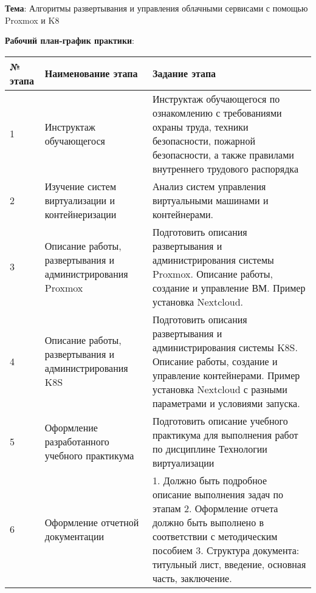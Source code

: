 
\textbf{Тема}: Алгоритмы развертывания и управления облачными сервисами с помощью Proxmox и K8

\textbf{Рабочий план-график практики}:

\begin{longtable}{|p{1cm}|p{6cm}|p{7cm}|}
    \hline
    № этапа & Наименование этапа & Задание этапа \\
    \hline
    1 & Инструктаж обучающегося & Инструктаж обучающегося по ознакомлению с требованиями охраны труда, техники безопасности, пожарной безопасности, а также правилами внутреннего трудового распорядка \\
    \hline
    2 & Изучение систем виртуализации и контейнеризации & Анализ систем управления виртуальными машинами и контейнерами. \\
    \hline
    3 & Описание работы, развертывания и администрирования Proxmox & Подготовить описания развертывания и администрирования системы Proxmox. Описание работы, создание и управление ВМ. Пример установка Nextcloud. \\
    \hline
    4 & Описание работы, развертывания и администрирования K8S & Подготовить описания развертывания и администрирования системы K8S. Описание работы, создание и управление контейнерами. Пример установка Nextcloud с разными параметрами и условиями запуска. \\
    \hline
    5 & Оформление разработанного учебного практикума & Подготовить описание учебного практикума для выполнения работ по дисциплине Технологии виртуализации \\
    \hline
    6 & Оформление отчетной документации & 1. Должно быть подробное описание выполнения задач по этапам 2. Оформление отчета должно быть выполнено в соответствии с методическим пособием\cite{markina} 3. Структура документа: титульный лист, введение, основная часть, заключение. \\
    \hline
\end{longtable}

\clearpage